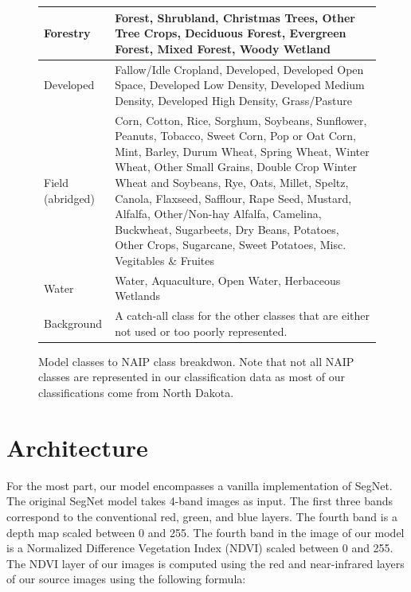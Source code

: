 \documentclass[12pt]{article}
\begin{document}
\begin{figure}
  \begin{tabular}[]{|p{2cm}|p{12cm}|}
  \hline
  Forestry & Forest, Shrubland, Christmas Trees, Other Tree Crops, Deciduous Forest, Evergreen Forest, Mixed Forest, Woody Wetland \\ \hline
  Developed & Fallow/Idle Cropland, Developed, Developed Open Space, Developed Low Density, Developed Medium Density, Developed High Density, Grass/Pasture \\ \hline
  Field (abridged) & Corn, Cotton, Rice, Sorghum, Soybeans, Sunflower, Peanuts, Tobacco, Sweet Corn, Pop or Oat Corn, Mint, Barley, Durum Wheat, Spring Wheat, Winter Wheat, Other Small Grains, Double Crop Winter Wheat and Soybeans, Rye, Oats, Millet, Speltz, Canola, Flaxseed, Safflour, Rape Seed, Mustard, Alfalfa, Other/Non-hay Alfalfa, Camelina, Buckwheat, Sugarbeets, Dry Beans, Potatoes, Other Crops, Sugarcane, Sweet Potatoes, Misc. Vegitables \& Fruites \\ \hline
  Water & Water, Aquaculture, Open Water, Herbaceous Wetlands \\ \hline
  Background & A catch-all class for the other classes that are either not used or too poorly represented. \\ \hline
  \end{tabular}
  \caption{Model classes to NAIP class breakdwon. Note that not all NAIP classes are represented in our classification data as most of our classifications come from North Dakota.}
\end{figure}


\begin{figure}
\end{figure}



\section{Architecture}

For the most part, our model encompasses a vanilla implementation of SegNet. The original SegNet model takes 4-band images as input. The first three bands correspond to the conventional red, green, and blue layers. The fourth band is a depth map scaled between 0 and 255. The fourth band in the image of our model is a Normalized Difference Vegetation Index (NDVI)\cite{NDVI} scaled between 0 and 255. The NDVI layer of our images is computed using the red and near-infrared layers of our source images using the following formula:  
\begin{figure}[!htb]
\end{figure}
\end{document}
